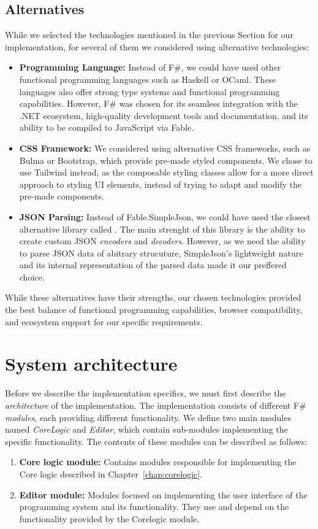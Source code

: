 \subsection{Alternatives}
While we selected the technologies mentioned in the previous Section for our implementation, for several of them we considered using alternative technologies:
\begin{itemize}
	\item \textbf{Programming Language:} Instead of F\#, we could have used other functional programming languages such as Haskell or OCaml.
	      These languages also offer strong type systems and functional programming capabilities.
	      However, F\# was chosen for its seamless integration with the .NET ecosystem, high-quality development tools and documentation, and its ability to be compiled to JavaScript via Fable.

	\item \textbf{CSS Framework:} We considered using alternative CSS frameworks, such as Bulma or Bootstrap, which provide pre-made styled components.
	      We chose to use Tailwind instead, as the composable styling classes allow for a more direct approach to styling UI elements, instead of trying to adapt and modify the pre-made components.

	\item \textbf{JSON Parsing:} Instead of Fable.SimpleJson, we could have used the closest alternative library called \citet{thoth}.
	      The main strenght of this library is the ability to create custom JSON \emph{encoders} and \emph{decoders}.
	      However, as we need the ability to parse JSON data of abitrary strucuture, SimpleJson's lightweight nature and its internal representation of the parsed data made it our preffered choice.
\end{itemize}
While these alternatives have their strengths, our chosen technologies provided the best balance of functional programming capabilities, browser compatibility, and ecosystem support for our specific requirements.


\section{System architecture}
\label{sec:appArch}
Before we describe the implementation specifics, we must first describe the \emph{architecture} of the implementation.
The implementation consists of different F\# \emph{modules}, each providing different functionality.
We define two main modules named \emph{CoreLogic} and \emph{Editor}, which contain sub-modules implementing the specific functionality.
The contents of these modules can be described as follows:
\begin{enumerate}
	\item \textbf{Core logic module:} Contains modules responsible for implementing the Core logic described in Chapter~\ref{chap:corelogic}.
	\item \textbf{Editor module:} Modules focused on implementing the user interface of the programming system and its functionality.
	      They use and depend on the functionality provided by the Corelogic module.
\end{enumerate}

